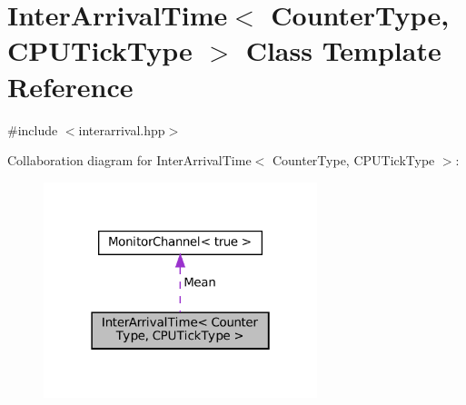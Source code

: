 \hypertarget{classInterArrivalTime}{}\section{Inter\+Arrival\+Time$<$ Counter\+Type, C\+P\+U\+Tick\+Type $>$ Class Template Reference}
\label{classInterArrivalTime}


{\ttfamily \#include $<$interarrival.\+hpp$>$}



Collaboration diagram for Inter\+Arrival\+Time$<$ Counter\+Type, C\+P\+U\+Tick\+Type $>$\+:\nopagebreak
\begin{figure}[H]
\begin{center}
\leavevmode
\includegraphics[width=226pt]{classInterArrivalTime__coll__graph}
\end{center}
\end{figure}
